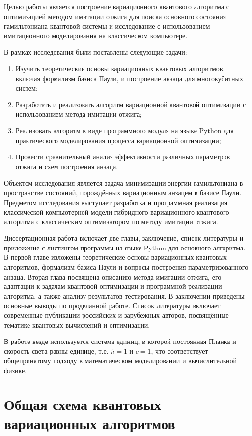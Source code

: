 \documentclass[a4paper]{report}
\begin{document}
Целью работы является построение вариационного квантового алгоритма с оптимизацией методом имитации отжига для поиска основного состояния гамильтониана квантовой системы и исследование с использованием имитационного моделирования на классическом компьютере.

В рамках исследования были поставлены следующие задачи:
\begin{enumerate}
    \item Изучить теоретические основы вариационных квантовых алгоритмов, включая формализм базиса Паули, и построение анзаца для многокубитных систем;
    \item Разработать и реализовать алгоритм вариационной квантовой оптимизации с использованием метода имитации отжига;
    \item Реализовать алгоритм в виде программного модуля на языке Python для практического моделирования процесса вариационной оптимизации;
    \item Провести сравнительный анализ эффективности различных параметров отжига и схем построения анзаца.
\end{enumerate}

Объектом исследования является задача минимизации энергии гамильтониана в пространстве состояний, порождённых вариационным анзацем в базисе Паули. Предметом исследования выступает разработка и программная реализация классической компьютерной модели гибридного вариационного квантового алгоритма с классическим оптимизатором по методу имитации отжига.

Диссертационная работа включает две главы, заключение, список литературы и приложение с листингом программы на языке Python для основного алгоритма. В первой главе изложены теоретические основы вариационных квантовых алгоритмов, формализм базиса Паули и вопросы построения параметризованного анзаца. Вторая глава посвящена описанию метода имитации отжига, его адаптации к задачам квантовой оптимизации и программной реализации алгоритма, а также анализу результатов тестирования. В заключении приведены основные выводы по проделанной работе. Список литературы включает современные публикации российских и зарубежных авторов, посвящённые тематике квантовых вычислений и оптимизации.

В работе везде используется система единиц, в которой постоянная Планка и скорость света равны единице, т.е. $\hbar=1$ и $c=1$, что соответствует общепринятому подходу в математическом моделировании и вычислительной физике.


\chapter{Общая схема квантовых вариационных алгоритмов}
\end{document}
